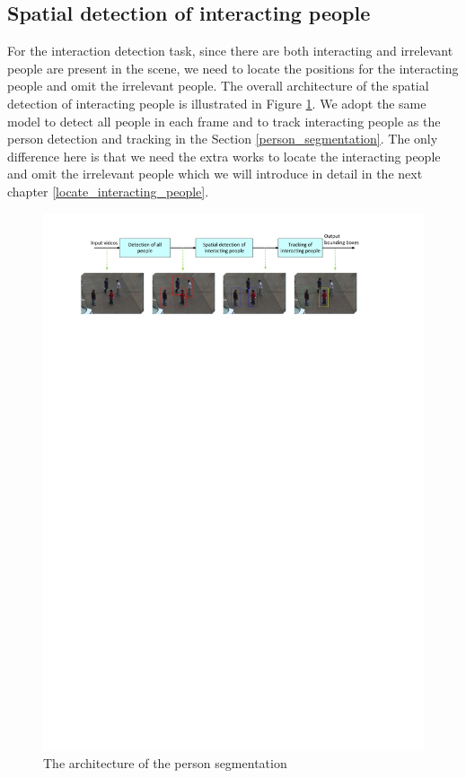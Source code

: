 \subsection{Spatial detection of interacting people}
For the interaction detection task, since there are both interacting and irrelevant people are present in the scene, we need to locate the positions for the interacting people and omit the irrelevant people. The overall architecture of the spatial detection of interacting people is illustrated in Figure \ref{fig:ip_det}. We adopt the same model to detect all people in each frame and to track interacting people as the person detection and tracking in the Section \ref{person_segmentation}. The only difference here is that we need the extra works to locate the interacting people and omit the irrelevant people which we will introduce in detail in the next chapter \ref{locate_interacting_people}.  
\begin{figure}
	\includegraphics[trim=2cm 24cm 0cm 1cm]{fig01/ip_det.pdf}
	\caption{The architecture of the person segmentation}
	\label{fig:ip_det}
\end{figure}

